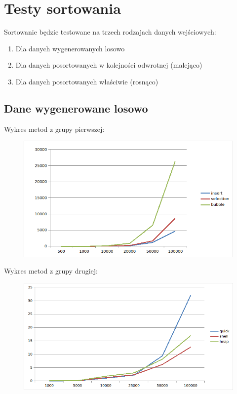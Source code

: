 \documentclass{article}
\begin{document}
\section*{Testy sortowania}
Sortowanie będzie testowane na trzech rodzajach danych wejściowych:
\begin{enumerate}
    \item Dla danych wygenerowanych losowo
    \item Dla danych posortowanych w kolejności odwrotnej (malejąco)
    \item Dla danych posortowanych właściwie (rosnąco)
\end{enumerate}

\subsection*{Dane wygenerowane losowo}
Wykres metod z grupy pierwszej:
\begin{figure}[H]
    \centering
    \includegraphics[width=\textwidth]{"../assets/1_1.png"}
    \label{fig:1_1}
\end{figure}


Wykres metod z grupy drugiej:
\begin{figure}[H]
    \centering
    \includegraphics[width=\textwidth]{"../assets/1_2.png"}
    \label{fig:1_2}
\end{figure}
\end{document}
